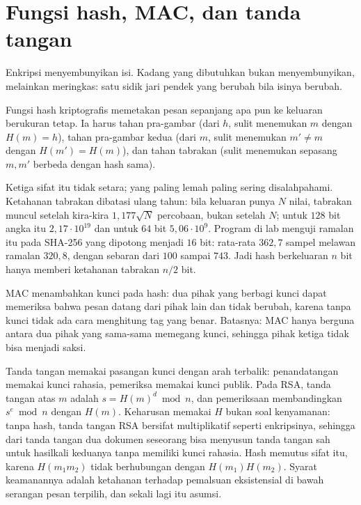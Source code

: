 
\section{Fungsi hash, MAC, dan tanda tangan}

Enkripsi menyembunyikan isi. Kadang yang dibutuhkan bukan menyembunyikan, melainkan meringkas:
satu sidik jari pendek yang berubah bila isinya berubah.

\begin{definisi}
Fungsi hash kriptografis memetakan pesan sepanjang apa pun ke keluaran berukuran tetap. Ia
harus tahan pra-gambar (dari $h$, sulit menemukan $m$ dengan $H(m)=h$), tahan pra-gambar
kedua (dari $m$, sulit menemukan $m'\neq m$ dengan $H(m')=H(m)$), dan tahan tabrakan (sulit
menemukan sepasang $m,m'$ berbeda dengan hash sama).
\end{definisi}

Ketiga sifat itu tidak setara; yang paling lemah paling sering disalahpahami. Ketahanan
tabrakan dibatasi ulang tahun: bila keluaran punya $N$ nilai, tabrakan muncul setelah kira-kira
$1{,}177\sqrt N$ percobaan, bukan setelah $N$; untuk $128$ bit angka itu $2{,}17\cdot10^{19}$
dan untuk $64$ bit $5{,}06\cdot10^{9}$. Program di lab menguji ramalan itu pada SHA-256 yang
dipotong menjadi $16$ bit: rata-rata $362{,}7$ sampel melawan ramalan $320{,}8$, dengan sebaran
dari $100$ sampai $743$. Jadi hash berkeluaran $n$ bit hanya memberi ketahanan tabrakan $n/2$
bit.

MAC menambahkan kunci pada hash: dua pihak yang berbagi kunci dapat memeriksa bahwa pesan
datang dari pihak lain dan tidak berubah, karena tanpa kunci tidak ada cara menghitung tag yang
benar. Batasnya: MAC hanya berguna antara dua pihak yang sama-sama memegang kunci, sehingga
pihak ketiga tidak bisa menjadi saksi.

Tanda tangan memakai pasangan kunci dengan arah terbalik: penandatangan memakai kunci rahasia,
pemeriksa memakai kunci publik. Pada RSA, tanda tangan atas $m$ adalah $s=H(m)^d\bmod n$, dan
pemeriksaan membandingkan $s^e\bmod n$ dengan $H(m)$. Keharusan memakai $H$ bukan soal
kenyamanan: tanpa hash, tanda tangan RSA bersifat multiplikatif seperti enkripsinya,
sehingga dari tanda tangan dua dokumen seseorang bisa menyusun tanda tangan sah untuk hasilkali
keduanya tanpa memiliki kunci rahasia. Hash memutus sifat itu, karena $H(m_1m_2)$ tidak
berhubungan dengan $H(m_1)H(m_2)$. Syarat keamanannya adalah ketahanan terhadap pemalsuan
eksistensial di bawah serangan pesan terpilih, dan sekali lagi itu asumsi.

